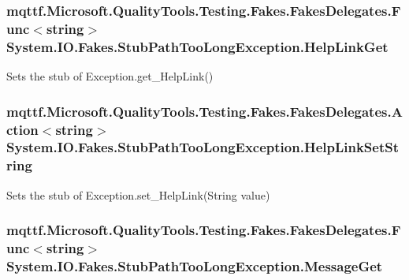 \hypertarget{class_system_1_1_i_o_1_1_fakes_1_1_stub_path_too_long_exception_aa874ad1ba4b185abbfed83cab68a8b38}{
\subsubsection[{Help\-Link\-Get}]{\setlength{\rightskip}{0pt plus 5cm}mqttf.\-Microsoft.\-Quality\-Tools.\-Testing.\-Fakes.\-Fakes\-Delegates.\-Func$<$string$>$ System.\-I\-O.\-Fakes.\-Stub\-Path\-Too\-Long\-Exception.\-Help\-Link\-Get}}\label{class_system_1_1_i_o_1_1_fakes_1_1_stub_path_too_long_exception_aa874ad1ba4b185abbfed83cab68a8b38}


Sets the stub of Exception.\-get\-\_\-\-Help\-Link()

\hypertarget{class_system_1_1_i_o_1_1_fakes_1_1_stub_path_too_long_exception_aab5ade51a51bfd2e6ac8db242a647978}{
\subsubsection[{Help\-Link\-Set\-String}]{\setlength{\rightskip}{0pt plus 5cm}mqttf.\-Microsoft.\-Quality\-Tools.\-Testing.\-Fakes.\-Fakes\-Delegates.\-Action$<$string$>$ System.\-I\-O.\-Fakes.\-Stub\-Path\-Too\-Long\-Exception.\-Help\-Link\-Set\-String}}\label{class_system_1_1_i_o_1_1_fakes_1_1_stub_path_too_long_exception_aab5ade51a51bfd2e6ac8db242a647978}


Sets the stub of Exception.\-set\-\_\-\-Help\-Link(\-String value)

\hypertarget{class_system_1_1_i_o_1_1_fakes_1_1_stub_path_too_long_exception_affb8a0cf42d01fe82a25be891b13791d}{
\subsubsection[{Message\-Get}]{\setlength{\rightskip}{0pt plus 5cm}mqttf.\-Microsoft.\-Quality\-Tools.\-Testing.\-Fakes.\-Fakes\-Delegates.\-Func$<$string$>$ System.\-I\-O.\-Fakes.\-Stub\-Path\-Too\-Long\-Exception.\-Message\-Get}}\label{class_system_1_1_i_o_1_1_fakes_1_1_stub_path_too_long_exception_affb8a0cf42d01fe82a25be891b13791d}


